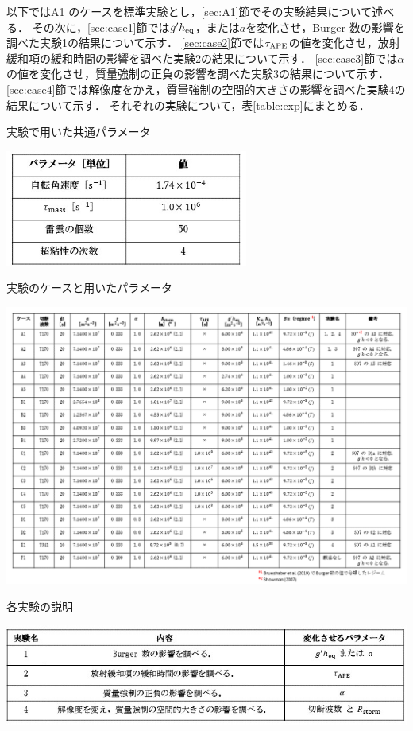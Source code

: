 \documentclass[a4j,12pt,openbib,oneside]{jreport}
\begin{document}
以下ではA1 のケースを標準実験とし，\ref{sec:A1}節でその実験結果について述べる．
%
その次に，\ref{sec:case1}節では$g'h_{{\rm{eq}}}$，または$a$を変化させ，Burger 数の影響を調べた実験1の結果について示す．
\ref{sec:case2}節では$\tau_{{\rm{APE}}}$の値を変化させ，放射緩和項の緩和時間の影響を調べた実験2の結果について示す．
\ref{sec:case3}節では$\alpha$の値を変化させ，質量強制の正負の影響を調べた実験3の結果について示す．
\ref{sec:case4}節では解像度をかえ，質量強制の空間的大きさの影響を調べた実験4の結果について示す．
それぞれの実験について，表\ref{table:exp}にまとめる．
\begin{table}[ht]
  \caption{実験で用いた共通パラメータ}
  \label{table1}
  \begin{center}
    \includegraphics[clip,width=8cm]{./fig/model/table1.jpg}
  \end{center}
\end{table}
%
%
\newpage
\begin{landscape}
\begin{table}[t]
  \caption{実験のケースと用いたパラメータ}
  \label{table2}
  \begin{center}
    \includegraphics[clip,width=20cm]{./fig/model/table2_v2.png}
  \end{center}
\end{table}
\end{landscape}
%
\begin{table}[ht]
  \caption{各実験の説明}
  \label{table:exp}
  \begin{center}
    \includegraphics[clip,width=14cm]{./fig/model/table_exp.jpg}
  \end{center}
\end{table}
%
\clearpage
\def\chap3{実験結果}
\end{document}
